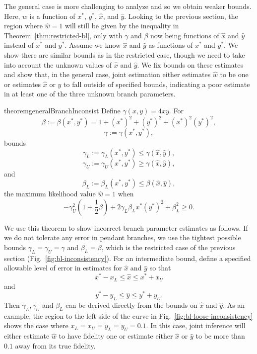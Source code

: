 \documentclass[11pt]{article}
\begin{document}
The general case is more challenging to analyze and so we obtain weaker bounds.
Here, $\hat{w}$ is a function of $x^*$, $y^*$, $\hat{x}$, and $\hat{y}$.
Looking to the previous section, the region where $\hat{w}=1$ will still be given by the inequality in Theorem~\ref{thm:restricted-bl}, only with $\gamma$ and $\beta$ now being functions of $\hat{x}$ and $\hat{y}$ instead of $x^*$ and $y^*$.
Assume we know $\hat{x}$ and $\hat{y}$ as functions of $x^*$ and $y^*$.
We show there are similar bounds as in the restricted case, though we need to take into account the unknown values of $\hat{x}$ and $\hat{y}$.
We fix bounds on these estimates and show that, in the general case, joint estimation either estimates $\hat{w}$ to be one or estimates $\hat{x}$ or $\hat{y}$ to fall outside of specified bounds, indicating a poor estimate in at least one of the three unknown branch parameters.
\begin{restatable}{theorem}{generalBranchInconsist}
\label{thm:general-bl}
Define $\gamma(x, y) = 4xy$.
For
\[
\beta := \beta(x^*, y^*) = 1+(x^*)^2+(y^*)^2+(x^*)^2(y^*)^2,
\]
\[
\gamma := \gamma(x^*, y^*),
\]
bounds
\[
\gamma_L := \gamma_{L}(x^*, y^*) \le \gamma(\hat{x}, \hat{y}),
\]
\[
\gamma_U := \gamma_{U}(x^*, y^*) \ge \gamma(\hat{x}, \hat{y}),
\]
and
\[
\beta_L := \beta_{L}(x^*, y^*) \le \beta(\hat{x}, \hat{y}),
\]
the maximum likelihood value $\hat{w}=1$ when
\[
-\gamma_{U}^2\left(1 + \frac{1}{2}\beta\right) + 2\gamma_{L}\beta_{L}x^*(y^*)^2 + \beta_{L}^2 \ge 0.
\]
\end{restatable}
We use this theorem to show incorrect branch parameter estimates as follows.
If we do not tolerate any error in pendant branches, we use the tightest possible bounds $\gamma_{L} = \gamma_{U} = \gamma$ and $\beta_{L} = \beta$, which is the restricted case of the previous section (Fig.~\ref{fig:bl-inconsistency}).
For an intermediate bound, define a specified allowable level of error in estimates for $\hat{x}$ and $\hat{y}$ so that
\[
x^*-x_{L} \le \hat{x} \le x^*+x_{U}
\]
and
\[
y^*-y_{L} \le \hat{y} \le y^*+y_{U}.
\]
Then $\gamma_L, \gamma_U$ and $\beta_L$ can be derived directly from the bounds on $\hat{x}$ and $\hat{y}$.
As an example, the region to the left side of the curve in Fig.~\ref{fig:bl-loose-inconsistency} shows the case where $x_L=x_U=y_L=y_U=0.1$.
In this case, joint inference will either estimate $\hat{w}$ to have fidelity one or estimate either $\hat{x}$ or $\hat{y}$ to be more than $0.1$ away from its true fidelity.
\end{document}
